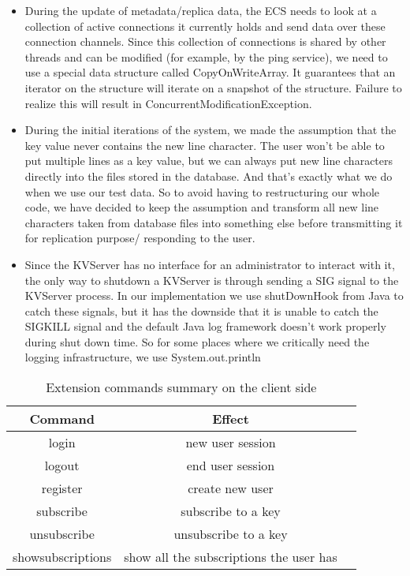 \documentclass[sigconf]{acmart}
\begin{document}
\begin{itemize}
	\item During the update of metadata/replica data, the ECS needs to look at a collection of active connections it currently holds and send data over these connection channels. Since this collection of connections is shared by other threads and can be modified (for example, by the ping service), we need to use a special data structure called CopyOnWriteArray. It guarantees that an iterator on the structure will iterate on a snapshot of the structure.\cite{CopyOnWrite} Failure to realize this will result in ConcurrentModificationException.
	\item During the initial iterations of the system, we made the assumption that the key value never contains the new line character. The user won't be able to put multiple lines as a key value, but we can always put new line characters directly into the files stored in the database. And that's exactly what we do when we use our test data. So to avoid having to restructuring our whole code, we have decided to keep the assumption and transform all new line characters taken from database files into something else before transmitting it for replication purpose/ responding to the user.
	\item Since the KVServer has no interface for an administrator to interact with it, the only way to shutdown a KVServer is through sending a SIG signal to the KVServer process. In our implementation we use shutDownHook from Java to catch these signals, but it has the downside that it is unable to catch the SIGKILL signal and the default Java log framework doesn't work properly during shut down time. So for some places where we critically need the logging infrastructure, we use System.out.println
\end{itemize}

\begin{table}
	\caption{Extension commands summary on the client side}
	\label{tab:commands}
	\begin{tabular}{ccl}
		\toprule
		Command&Effect\\
		\midrule
		login & new user session\\
		logout& end user session\\
		register & create new user\\
		subscribe & subscribe to a key\\
		unsubscribe & unsubscribe to a key\\
		showsubscriptions & show all the subscriptions the user has\\
		\bottomrule
	\end{tabular}
\end{table}
  
\end{document}
